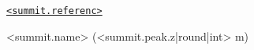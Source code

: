 \begin{minipage}{\textwidth}\centering
{\fontsize{25pt}{0pt}\selectfont \href{https://summits.sota.org.uk/summit/<summit.reference>}{\texttt{<summit.referenc>}}\par}
{\fontsize{10pt}{0pt}\selectfont <summit.name> (<summit.peak.z|round|int> m)\par}
\end{minipage}
